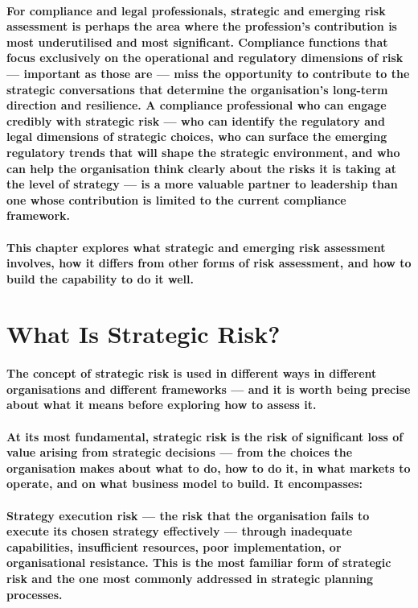 \paragraph{For compliance and legal professionals, strategic and emerging risk assessment is perhaps the area where the profession's contribution is most underutilised and most significant. Compliance functions that focus exclusively on the operational and regulatory dimensions of risk — important as those are — miss the opportunity to contribute to the strategic conversations that determine the organisation's long-term direction and resilience. A compliance professional who can engage credibly with strategic risk — who can identify the regulatory and legal dimensions of strategic choices, who can surface the emerging regulatory trends that will shape the strategic environment, and who can help the organisation think clearly about the risks it is taking at the level of strategy — is a more valuable partner to leadership than one whose contribution is limited to the current compliance framework.}
\paragraph{This chapter explores what strategic and emerging risk assessment involves, how it differs from other forms of risk assessment, and how to build the capability to do it well.}

\section{What Is Strategic Risk?}
\paragraph{The concept of strategic risk is used in different ways in different organisations and different frameworks — and it is worth being precise about what it means before exploring how to assess it.}
\paragraph{At its most fundamental, strategic risk is the risk of significant loss of value arising from strategic decisions — from the choices the organisation makes about what to do, how to do it, in what markets to operate, and on what business model to build. It encompasses:}
\paragraph{\textbf{Strategy execution risk} — the risk that the organisation fails to execute its chosen strategy effectively — through inadequate capabilities, insufficient resources, poor implementation, or organisational resistance. This is the most familiar form of strategic risk and the one most commonly addressed in strategic planning processes.}
